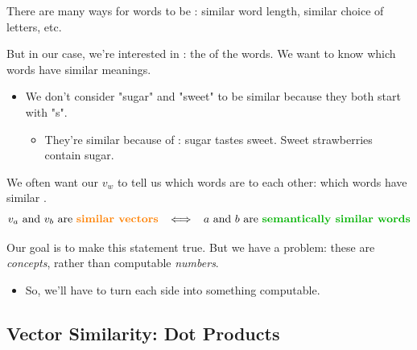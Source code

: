         \begin{clarification}
            There are many ways for words to be : similar word length, similar choice of letters, etc.

            But in our case, we're interested in : the  of the words. We want to know which words have similar meanings.
        \end{clarification}

        \begin{itemize}
            \item \miniex We don't consider "sugar" and "sweet" to be similar because they both start with "s". 
            
            \begin{itemize}
                \item They're similar because of : sugar tastes sweet. Sweet strawberries contain sugar.\\
            \end{itemize}
        \end{itemize}

        \begin{concept}
            We often want our  $v_w$ to tell us which words are  to each other: which words have similar .
            \begin{equation*}
                \text{$v_a$ and $v_b$ are \orgg{similar vectors}} 
                \;\;\iff\;\; 
                \text{$a$ and $b$ are \gren{semantically similar words}}
            \end{equation*}
        \end{concept}

        Our goal is to make this statement true. But we have a problem: these are \textit{concepts}, rather than computable \textit{numbers}. 

        \begin{itemize}
            \item So, we'll have to turn each side into something computable.
        \end{itemize}



    \phantom{}

    \subsection{Vector Similarity: Dot Products}

